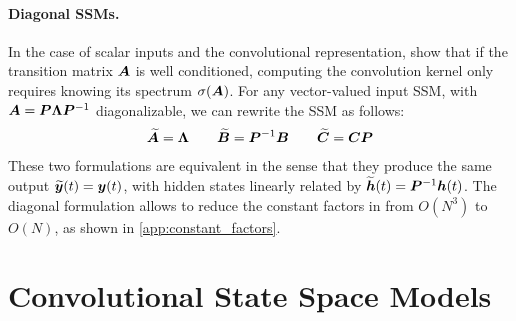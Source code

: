 \documentclass{article}
\newcommand{\TS}[1]{\par\noindent{\color{red}[TS]: #1}\par}
\begin{document}
\paragraph{Diagonal SSMs.} In the case of scalar inputs and the convolutional representation, \citet{gu2022s4d} show that if the transition matrix $\bm{A}$ is well conditioned, computing the convolution kernel only requires knowing its spectrum $\sigma(\bm{A})$. For any vector-valued input SSM, with $\bm{A} = \bm{P} \bm{\Lambda} \bm{P}^{-1}$ diagonalizable, we can rewrite the SSM as follows:
%
\begin{align}
\label{eq:ssm:diagonal}
\widetilde{\bm{A}} = \bm{\Lambda} \qquad \widetilde{\bm{B}} = \bm{P}^{-1} \bm{B} \qquad \widetilde{\bm{C}} = \bm{C} \bm{P}
\end{align}
These two formulations are equivalent in the sense that they produce the same output $\widetilde{\bm{y}}(t)=\bm{y}(t)$, with hidden states linearly related by $\widetilde{\bm{h}}(t) = \bm{P}^{-1} \bm{h}(t)$. The diagonal formulation allows to reduce the constant factors in  from $O(N^3)$ to $O(N)$, as shown in \cref{app:constant_factors}.
\section{Convolutional State Space Models}
\end{document}

